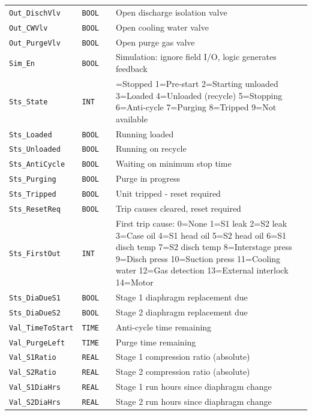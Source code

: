 {\begin{longtable}{@{}>{\raggedright\arraybackslash}p{3.4cm}>{\raggedright\arraybackslash}p{3.3cm}>{\raggedright\arraybackslash}p{1.3cm}>{\raggedright\arraybackslash}p{6.4cm}@{}}
\texttt{Out\_DischVlv} & \texttt{BOOL} &  & Open discharge isolation valve \\
\texttt{Out\_CWVlv} & \texttt{BOOL} &  & Open cooling water valve \\
\texttt{Out\_PurgeVlv} & \texttt{BOOL} &  & Open purge gas valve \\
\texttt{Sim\_En} & \texttt{BOOL} &  & Simulation: ignore field I/\allowbreak{}O, logic generates feedback \\
\texttt{Sts\_State} & \texttt{INT} &  & 0=Stopped 1=Pre-start 2=Starting unloaded 3=Loaded 4=Unloaded (recycle) 5=Stopping 6=Anti-cycle 7=Purging 8=Tripped 9=Not available \\
\texttt{Sts\_Loaded} & \texttt{BOOL} &  & Running loaded \\
\texttt{Sts\_Unloaded} & \texttt{BOOL} &  & Running on recycle \\
\texttt{Sts\_AntiCycle} & \texttt{BOOL} &  & Waiting on minimum stop time \\
\texttt{Sts\_Purging} & \texttt{BOOL} &  & Purge in progress \\
\texttt{Sts\_Tripped} & \texttt{BOOL} &  & Unit tripped - reset required \\
\texttt{Sts\_ResetReq} & \texttt{BOOL} &  & Trip causes cleared, reset required \\
\texttt{Sts\_FirstOut} & \texttt{INT} &  & First trip cause: 0=None 1=S1 leak 2=S2 leak 3=Case oil 4=S1 head oil 5=S2 head oil 6=S1 disch temp 7=S2 disch temp 8=Interstage press 9=Disch press 10=Suction press 11=Cooling water 12=Gas detection 13=External interlock 14=Motor \\
\texttt{Sts\_DiaDueS1} & \texttt{BOOL} &  & Stage 1 diaphragm replacement due \\
\texttt{Sts\_DiaDueS2} & \texttt{BOOL} &  & Stage 2 diaphragm replacement due \\
\texttt{Val\_TimeToStart} & \texttt{TIME} &  & Anti-cycle time remaining \\
\texttt{Val\_PurgeLeft} & \texttt{TIME} &  & Purge time remaining \\
\texttt{Val\_S1Ratio} & \texttt{REAL} &  & Stage 1 compression ratio (absolute) \\
\texttt{Val\_S2Ratio} & \texttt{REAL} &  & Stage 2 compression ratio (absolute) \\
\texttt{Val\_S1DiaHrs} & \texttt{REAL} &  & Stage 1 run hours since diaphragm change \\
\texttt{Val\_S2DiaHrs} & \texttt{REAL} &  & Stage 2 run hours since diaphragm change \\

\end{longtable}}
